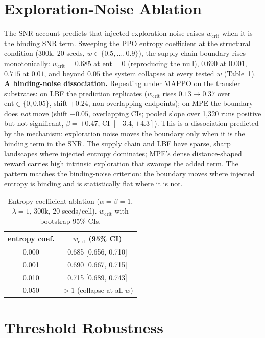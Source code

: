 \documentclass[letterpaper]{article} %
\theoremstyle{plain}
\newcommand{\wcrit}{w_{\mathrm{crit}}}
\begin{document}
\section{Exploration-Noise Ablation}
\label{sec:s_entropy}

The SNR account predicts that injected exploration noise raises $\wcrit$ when it is the binding
SNR term. Sweeping the PPO entropy coefficient at the structural condition (300k, 20 seeds,
$w\in\{0.5,\dots,0.9\}$), the supply-chain boundary rises monotonically:
$\wcrit=0.685$ at $\text{ent}{=}0$ (reproducing the null), $0.690$ at
$0.001$, $0.715$ at $0.01$, and beyond $0.05$ the system collapses at every tested $w$
(Table~\ref{tab:entropy}). \textbf{A binding-noise dissociation.} Repeating under MAPPO on the
transfer substrates: on LBF the prediction replicates ($\wcrit$ rises $0.13\to0.37$ over
$\text{ent}\in\{0,0.05\}$, shift $+0.24$, non-overlapping endpoints); on MPE the boundary does
\emph{not} move (shift $+0.05$, overlapping CIs; pooled slope over 1{,}320 runs positive but
not significant, $\beta{=}{+}0.47$, CI $[-3.4,+4.3]$). This is a dissociation predicted by the
mechanism: exploration noise moves the boundary only when it is the binding term in the SNR.
The supply chain and LBF have sparse, sharp landscapes where injected entropy dominates; MPE's
dense distance-shaped reward carries high intrinsic exploration that swamps the added term. The
pattern matches the binding-noise criterion: the boundary moves where injected entropy is binding
and is statistically flat where it is not.

\begin{table}[t]
\centering \small
\caption{Entropy-coefficient ablation ($\alpha{=}\beta{=}1$, $\lambda{=}1$, 300k, 20
seeds/cell). $\wcrit$ with bootstrap 95\% CIs.}
\label{tab:entropy}
\begin{tabular}{cc}
\toprule
entropy coef. & $\wcrit$ (95\% CI) \\
\midrule
0.000 & 0.685 [0.656, 0.710] \\
0.001 & 0.690 [0.667, 0.715] \\
0.010 & 0.715 [0.689, 0.743] \\
0.050 & $>1$ (collapse at all $w$) \\
\bottomrule
\end{tabular}
\end{table}

\section{Threshold Robustness}
\label{sec:s_robustness}
\end{document}
